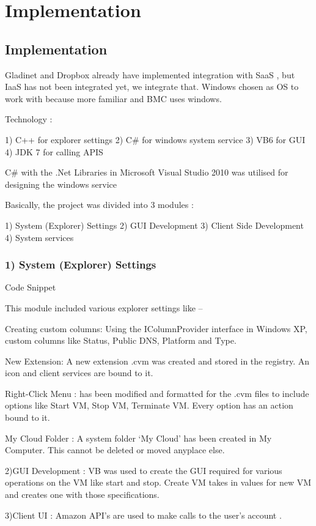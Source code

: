 \chapter{Implementation}

\section{Implementation}

Gladinet and Dropbox already have implemented integration with SaaS , but IaaS has not been integrated yet, we integrate that.  
Windows chosen as OS to work with because more familiar and BMC uses windows. 

Technology :

1)  C++ for explorer settings
2)	C# for windows system service
3)	VB6 for GUI
4)	JDK 7 for calling APIS

C# with the .Net Libraries in Microsoft Visual Studio 2010 was utilised for designing the windows service


	Basically, the project was divided into 3 modules :  

1)	System (Explorer) Settings
2)	GUI Development
3)	Client Side Development
4)	 System services

\subsection{1)  System (Explorer) Settings}
Code Snippet

This module included various explorer settings like –

 Creating custom columns: Using the IColumnProvider interface in Windows XP, custom columns like Status, Public DNS, Platform and Type. 

New Extension: A new extension .cvm was created and stored in the registry. An icon and client services are bound to it.

Right-Click Menu : has been modified and formatted for the .cvm files to include options like Start VM, Stop VM, Terminate VM. Every option has an action bound to it.

My Cloud Folder : A system folder ‘My Cloud’ has been created in My Computer. This cannot be deleted or moved anyplace else.

2)GUI Development : VB was used to create the GUI required for various operations on the VM like start and stop.  Create VM takes in values for new VM and creates one with those specifications. 

3)Client UI : Amazon API’s are used to make calls to the user’s account . 


